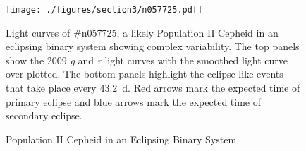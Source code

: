 \begin{figure}[H]
\begin{center}
\singlespace
\texttt{[image: ./figures/section3/n057725.pdf]}
\end{center}
\singlespace
\caption{Population II Cepheid in an Eclipsing Binary System} Light curves of  \#n057725, a likely Population II Cepheid in an eclipsing binary system showing complex variability. The top panels show the 2009 \textit{g} and \textit{r} light curves with the smoothed light curve over-plotted. The bottom panels highlight the eclipse-like events that take place every 43.2~d. Red arrows mark the expected time of primary eclipse and blue arrows mark the expected time of secondary eclipse. \label{fig:ceph}

\end{figure}


